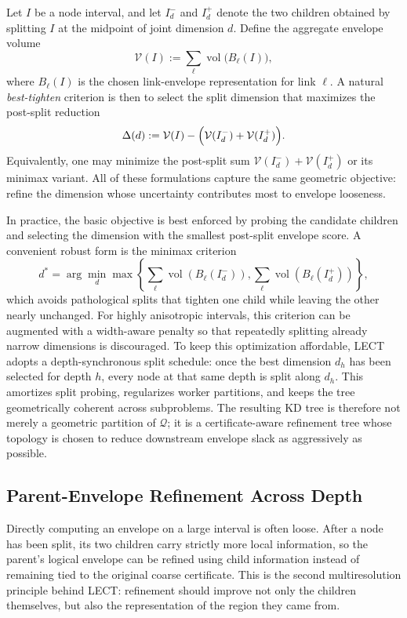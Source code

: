 \documentclass[journal]{IEEEtran}
\newcommand{\Q}{\ensuremath{\mathcal{Q}}}
\begin{document}
Let $I$ be a node interval, and let $I_d^{-}$ and $I_d^{+}$ denote the two
children obtained by splitting $I$ at the midpoint of joint dimension $d$.
Define the aggregate envelope volume
\[
\mathcal{V}(I) := \sum_{\ell} \operatorname{vol}\bigl(B_\ell(I)\bigr),
\]
where $B_\ell(I)$ is the chosen link-envelope representation for link $\ell$.
A natural \emph{best-tighten} criterion is then to select the split dimension
that maximizes the post-split reduction
\[
\Delta(d) := \mathcal{V}(I)
- \Bigl(\mathcal{V}(I_d^{-}) + \mathcal{V}(I_d^{+})\Bigr).
\]
Equivalently, one may minimize the post-split sum
$\mathcal{V}(I_d^{-}) + \mathcal{V}(I_d^{+})$ or its minimax variant. All of
these formulations capture the same geometric objective: refine the dimension
whose uncertainty contributes most to envelope looseness.

In practice, the basic objective is best enforced by probing the candidate
children and selecting the dimension with the smallest post-split envelope
score. A convenient robust form is the minimax criterion
\[
d^* = \arg\min_d
\max\!\left\{\sum_{\ell}\operatorname{vol}(B_\ell(I_d^-)),
\sum_{\ell}\operatorname{vol}(B_\ell(I_d^+))\right\},
\]
which avoids pathological splits that tighten one child while leaving the other
nearly unchanged. For highly anisotropic intervals, this criterion can be
augmented with a width-aware penalty so that repeatedly splitting already
narrow dimensions is discouraged. To keep this optimization affordable, LECT
adopts a depth-synchronous split schedule: once the best dimension $d_h$ has
been selected for depth $h$, every node at that same depth is split along
$d_h$. This amortizes split probing, regularizes worker partitions, and keeps
the tree geometrically coherent across subproblems. The resulting KD tree is
therefore not merely a geometric
partition of $\Q$; it is a certificate-aware refinement tree whose topology is
chosen to reduce downstream envelope slack as aggressively as possible.

\subsection{Parent-Envelope Refinement Across Depth}
\label{sec:lect_parent_refine}

Directly computing an envelope on a large interval is often loose. After a node
has been split, its two children carry strictly more local information, so the
parent's logical envelope can be refined using child information instead of
remaining tied to the original coarse certificate. This is the second
multiresolution principle behind LECT: refinement should improve not only the
children themselves, but also the representation of the region they came from.
\end{document}
